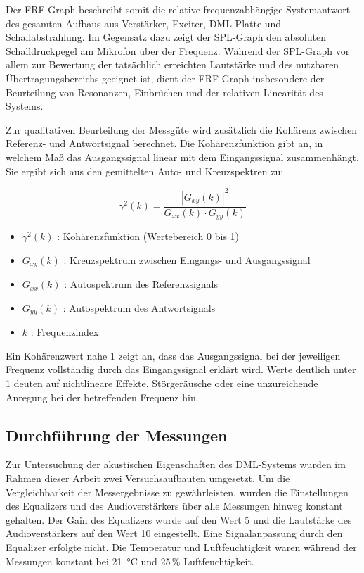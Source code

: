 Der FRF-Graph beschreibt somit die relative frequenzabhängige Systemantwort des gesamten Aufbaus aus Verstärker, Exciter, DML-Platte und Schallabstrahlung. Im Gegensatz dazu zeigt der SPL-Graph den absoluten Schalldruckpegel am Mikrofon über der Frequenz. Während der SPL-Graph vor allem zur Bewertung der tatsächlich erreichten Lautstärke und des nutzbaren Übertragungsbereichs geeignet ist, dient der FRF-Graph insbesondere der Beurteilung von Resonanzen, Einbrüchen und der relativen Linearität des Systems.

Zur qualitativen Beurteilung der Messgüte wird zusätzlich die Kohärenz zwischen Referenz- und Antwortsignal berechnet. Die Kohärenzfunktion gibt an, in welchem Maß das Ausgangssignal linear mit dem Eingangssignal zusammenhängt. Sie ergibt sich aus den gemittelten Auto- und Kreuzspektren zu:

\begin{equation}
\gamma^2(k) = \frac{|G_{xy}(k)|^2}{G_{xx}(k) \cdot G_{yy}(k)}
\end{equation}

\begin{itemize}
    \item $\gamma^2(k)$ : Kohärenzfunktion (Wertebereich 0 bis 1)
    \item $G_{xy}(k)$ : Kreuzspektrum zwischen Eingangs- und Ausgangssignal
    \item $G_{xx}(k)$ : Autospektrum des Referenzsignals
    \item $G_{yy}(k)$ : Autospektrum des Antwortsignals
    \item $k$ : Frequenzindex
\end{itemize}

Ein Kohärenzwert nahe 1 zeigt an, dass das Ausgangssignal bei der jeweiligen Frequenz vollständig durch das Eingangssignal erklärt wird. Werte deutlich unter 1 deuten auf nichtlineare Effekte, Störgeräusche oder eine unzureichende Anregung bei der betreffenden Frequenz hin.

\clearpage

 \subsection{Durchführung der Messungen}

Zur Untersuchung der akustischen Eigenschaften des DML-Systems wurden im Rahmen dieser Arbeit zwei Versuchsaufbauten umgesetzt. Um die Vergleichbarkeit der Messergebnisse zu gewährleisten, wurden die Einstellungen des Equalizers und des Audioverstärkers über alle Messungen hinweg konstant gehalten. Der Gain des Equalizers wurde auf den Wert 5 und die Lautstärke des Audioverstärkers auf den Wert 10 eingestellt. Eine Signalanpassung durch den Equalizer erfolgte nicht. Die Temperatur und Luftfeuchtigkeit waren während der Messungen konstant bei \SI{21}{\degreeCelsius} und 25\,\% Luftfeuchtigkeit.

